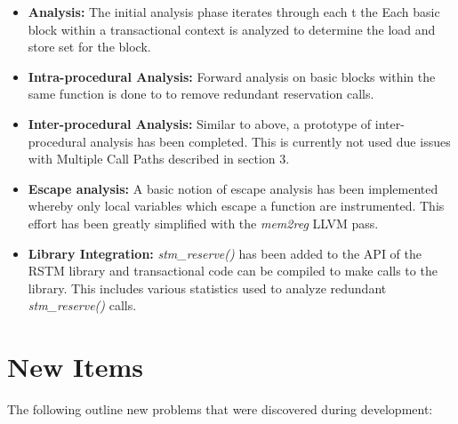 \documentclass[letterpaper,twocolumn,10pt]{article}
\begin{document}
\begin{itemize}

\item {\bf Analysis:} The initial analysis phase iterates through each t the Each basic block within a transactional context is analyzed to determine the load and store set for the block.

\item {\bf Intra-procedural Analysis:} Forward analysis on basic blocks within the same function is done to to remove redundant reservation calls.

\item {\bf Inter-procedural Analysis:} Similar to above, a prototype of inter-procedural analysis has been completed. This is currently not used due issues with Multiple Call Paths described in section 3.

\item {\bf Escape analysis:} A basic notion of escape analysis has been implemented whereby only local variables which escape a function are instrumented. This effort has been greatly simplified with the \emph{mem2reg} LLVM pass.

\item {\bf Library Integration:} \emph{stm\_reserve()} has been added to the API of the RSTM library and  transactional code can be compiled to make calls to the library. This includes various statistics used to analyze redundant \emph{stm\_reserve()} calls.

\end{itemize}

\section{New Items}

The following outline new problems that were discovered during development:
\end{document}
